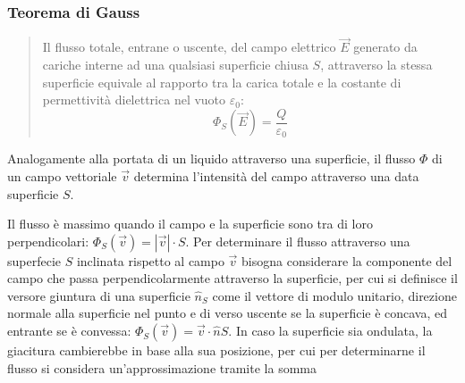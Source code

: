 \documentclass{article}
\numberwithin{equation}{subsection}
\begin{document}
\subsubsection{Teorema di Gauss}

\begin{quotation}
    Il flusso totale, entrane o uscente, del campo elettrico $\vec{E}$ generato da cariche interne ad una qualsiasi superficie chiusa $S$, attraverso 
    la stessa superficie equivale al rapporto tra la carica totale e la costante di permettività dielettrica nel vuoto $\varepsilon_0$:
    \begin{equation}
        \Phi_{S}(\vec{E})=\displaystyle\frac{Q}{\varepsilon_0}
    \end{equation}
\end{quotation}


Analogamente alla portata di un liquido attraverso una superficie, il flusso $\Phi$ di un campo vettoriale $\vec{v}$ determina l'intensità del campo attraverso una data superficie $S$. 
\begin{center}
\end{center}
Il flusso è massimo quando il campo e la superficie sono tra di loro perpendicolari: $\Phi_S(\vec{v})=|\vec{v}|\cdot S$. Per determinare il flusso attraverso una superfecie $S$ 
inclinata rispetto al campo $\vec{v}$ bisogna considerare la componente del campo che passa perpendicolarmente attraverso la superficie, per cui si definisce il versore 
giuntura di una superficie $\hat{n}_S$ come il vettore di modulo unitario, direzione normale alla superficie nel punto e di verso uscente se la superficie è concava, ed 
entrante se è convessa: $\Phi_S(\vec{v})=\vec{v}\cdot\hat{n}S$. 
In caso la superficie sia ondulata, la giacitura cambierebbe in base alla sua posizione, per cui per determinarne il flusso si considera un'approssimazione tramite la somma 
\end{document}
